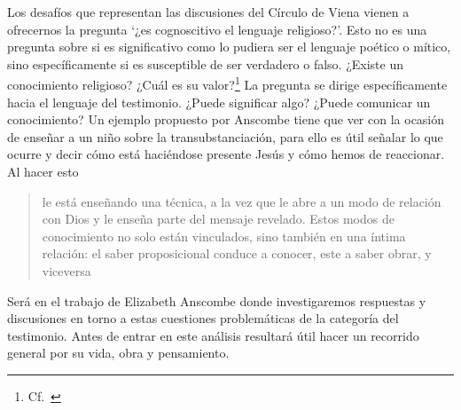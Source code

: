 Los desafíos que representan las discusiones del Círculo de Viena vienen a ofrecernos la pregunta \enquote*{¿es cognoscitivo el lenguaje religioso?}. Esto no es una pregunta sobre si es significativo como lo pudiera ser el lenguaje poético o mítico, sino específicamente si es susceptible de ser verdadero o falso. ¿Existe un conocimiento religioso? ¿Cuál es su valor?\footnote{Cf.~\cite[23]{conesa1994cc}} La pregunta se dirige específicamente hacia el lenguaje del testimonio. ¿Puede significar algo? ¿Puede comunicar un conocimiento? Un ejemplo propuesto por Anscombe tiene que ver con la ocasión de enseñar a un niño sobre la transubstanciación, para ello es útil señalar lo que ocurre y decir cómo está haciéndose presente Jesús y cómo hemos de reaccionar. Al hacer esto \blockquote[{\cite[21]{conesa1994cc}}]{le está enseñando una técnica, a la vez que le abre a un modo de relación con Dios y le enseña parte del mensaje revelado. Estos modos de conocimiento no solo están vinculados, sino también en una íntima relación: el saber proposicional conduce a conocer, este a saber obrar, y viceversa}.

Será en el trabajo de Elizabeth Anscombe donde investigaremos respuestas y discusiones en torno a estas cuestiones problemáticas de la categoría del testimonio. Antes de entrar en este análisis resultará útil hacer un recorrido general por su vida, obra y pensamiento.
